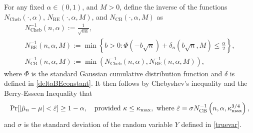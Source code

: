 \documentclass{iitthesis}
\theoremstyle{definition}
\begin{document}
For any fixed $\alpha \in (0,1)$, and $M>0$, define the inverse of the functions $N_\text{Cheb}(\cdot,\alpha)$, $N_\text{BE}(\cdot,\alpha,M)$, and $N_{\text{CB}}(\cdot,\alpha,M)$ as 
\begin{gather}\label{NCinv*}
N_\text{Cheb}^{-1}(n,\alpha) := \frac{1}{\sqrt{n \alpha}}, \\
\label{NBinv*}
N_\text{BE}^{-1}(n,\alpha,M) := \min \left \{ b>0 : \Phi\left(-b \sqrt{n}  \right)+\delta_n(b\sqrt{n},M)
\le \frac{\alpha}{2} \right \}, \\
\label{NCBinv}
N_{\text{CB}}^{-1}(n,\alpha,M) := \min\left(N_\text{Cheb}^{-1}(n,\alpha),N_\text{BE}^{-1}(n,\alpha,M)\right),
\end{gather}
where $\Phi$ is the standard Gaussian cumulative distribution function and $\delta$ is defined in \eqref{deltaBEconstant}. It then follows by Chebyshev's inequality and the Berry-Esseen Inequality that 
\begin{equation*}
\Pr[\left \lvert \hat{\mu}_n -\mu \right \rvert<\hat{\varepsilon}] \geq 1-\alpha, \quad \text{provided } \kappa\leq\kappa_{\max}, \text{ where }\hat{\varepsilon}=\sigma N_{\text{CB}}^{-1}\left(n,\alpha,\kappa_{\max}^{3/4}\right), 
\end{equation*} 
and $\sigma$ is the standard deviation of the random variable $Y$ defined in \eqref{truevar}.  
\end{document}
